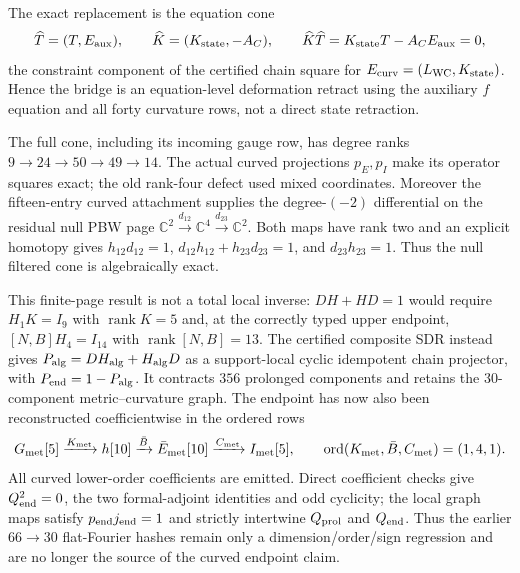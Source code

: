 \documentclass[11pt]{article}
\theoremstyle{definition}
\theoremstyle{remark}
\newcommand{\C}{\mathbb C}
\newcommand{\rank}{\operatorname{rank}}
\begin{document}
The exact replacement is the equation cone
\begin{equation}
 \widehat T=(T,E_{\rm aux}),\qquad
 \widehat K=(K_{\rm state},-A_C),\qquad
 \widehat K\widehat T
 =K_{\rm state}T-A_CE_{\rm aux}=0,
\end{equation}
the constraint component of the certified chain square for
$E_{\rm curv}=(L_{\rm WC},K_{\rm state})$.  Hence the bridge is an
equation-level deformation retract using the auxiliary $f$ equation and all
forty curvature rows, not a direct state retraction.

The full cone, including its incoming gauge row, has degree ranks
$9\to24\to50\to49\to14$.  The actual curved projections $p_E,p_I$ make its
operator squares exact; the old rank-four defect used mixed coordinates.
Moreover the fifteen-entry curved attachment supplies the degree-$(-2)$
differential on the residual null PBW page
$\C^2\xrightarrow{d_{12}}\C^4\xrightarrow{d_{23}}\C^2$.
Both maps have rank two and an explicit homotopy gives
$h_{12}d_{12}=1$, $d_{12}h_{12}+h_{23}d_{23}=1$, and $d_{23}h_{23}=1$.
Thus the null filtered cone is algebraically exact.

This finite-page result is not a total local inverse: $DH+HD=1$ would require
$H_1K=I_9$ with $\rank K=5$ and, at the correctly typed upper endpoint,
$[N,B]H_4=I_{14}$ with $\rank[N,B]=13$.  The certified composite SDR instead
gives $P_{\rm alg}=DH_{\rm alg}+H_{\rm alg}D$ as a support-local cyclic
idempotent chain projector, with $P_{\rm end}=1-P_{\rm alg}$.  It contracts
$356$ prolonged components and retains the $30$-component metric--curvature
graph.  The endpoint has now also been reconstructed coefficientwise in the
ordered rows
\begin{equation}\label{eq:exact-thirty-row-endpoint}
 G_{\rm met}[5]\xrightarrow{K_{\rm met}}h[10]
 \xrightarrow{\bar B} \bar E_{\rm met}[10]
 \xrightarrow{C_{\rm met}} I_{\rm met}[5],
 \qquad \operatorname{ord}(K_{\rm met},\bar B,C_{\rm met})=(1,4,1).
\end{equation}
All curved lower-order coefficients are emitted.  Direct coefficient checks
give $Q_{\rm end}^2=0$, the two formal-adjoint identities and odd cyclicity;
the local graph maps satisfy $p_{\rm end}j_{\rm end}=1$ and strictly
intertwine $Q_{\rm prol}$ and $Q_{\rm end}$.  Thus the earlier $66\to30$
flat-Fourier hashes remain only a dimension/order/sign regression and are no
longer the source of the curved endpoint claim.
\end{document}
